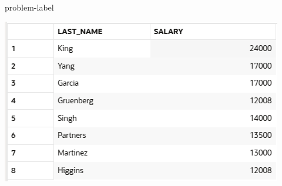 \begin{problem}{}{problem-label}
\begin{center}
  \includegraphics[scale=0.7]{images/c2a10-2.png}
\end{center}

\end{problem}

